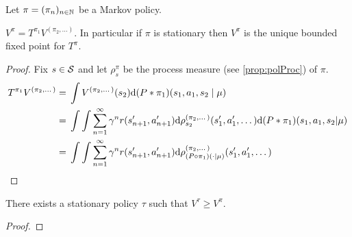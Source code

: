 \documentclass{article}
\begin{document}
Let $\pi = (\pi_n)_{n \in \mathbb{N}}$ be a
Markov policy.

\begin{prop}
  $V^\pi = T^{\pi_1} V^{(\pi_2, \dots)}$.
  In particular if $\pi$ is stationary then $V^\pi$ is the unique bounded
  fixed point for $T^\pi$.
\end{prop}
\begin{proof}
  Fix $s \in \mathcal{S}$ and let $\rho_s^\pi$ be the process measure
  (see \cref{prop:polProc}) of $\pi$.
  \begin{align*}
    T^{\pi_1} V^{(\pi_2, \dots)}
    = & \; \int V^{(\pi_2, \dots)}(s_2) \mathrm{d} (P * \pi_1)(s_1, a_1, s_2 \mid \mu)
    \\ = & \; \int \int \sum_{n=1}^\infty \gamma^n r(s'_{n+1}, a'_{n+1})
    \mathrm{d} \rho_{s_2}^{(\pi_2, \dots)}(s'_1, a'_1, \dots)
    \mathrm{d} (P * \pi_1)(s_1, a_1, s_2 | \mu)
    \\ = & \; \int \int \sum_{n=1}^\infty \gamma^n r(s'_{n+1}, a'_{n+1})
    \mathrm{d} \rho_{(P \circ \pi_1)(\cdot \mid \mu)}^
    {(\pi_2, \dots)}(s'_1, a'_1, \dots)
  \end{align*}
\end{proof}

\begin{prop}
  There exists a stationary policy $\tau$ such that
  $V^\tau \geq V^\pi$.
\end{prop}
\begin{proof}

\end{proof}



\end{document}
